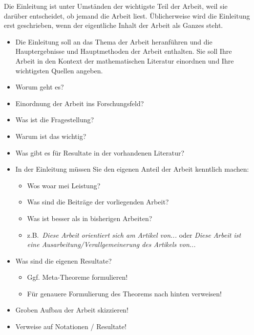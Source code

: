 {\color{change}

\noindent
Die Einleitung ist unter Umständen der wichtigste Teil der Arbeit, weil sie darüber entscheidet, ob jemand die Arbeit liest. Üblicherweise wird die Einleitung erst geschrieben, wenn der eigentliche Inhalt der Arbeit als Ganzes steht.

\begin{itemize}

\item Die Einleitung soll an das Thema der Arbeit heranführen und die Hauptergebnisse und Hauptmethoden der Arbeit enthalten. Sie soll Ihre Arbeit in den Kontext der mathematischen Literatur einordnen und Ihre wichtigsten Quellen angeben.

\item Worum geht es?
\item Einordnung der Arbeit ins Forschungsfeld?
\item Was ist die Fragestellung?
\item Warum ist das wichtig?
\item Was gibt es für Resultate in der vorhandenen Literatur?

\item In der Einleitung müssen Sie den eigenen Anteil der Arbeit kenntlich machen:
\begin{itemize}
\item Wos woar mei Leistung?
\item Was sind die Beiträge der vorliegenden Arbeit?
\item Was ist besser als in bisherigen Arbeiten?
\item z.B.\ \emph{Diese Arbeit orientiert sich am Artikel von...} oder \emph{Diese Arbeit
ist eine Ausarbeitung/Verallgemeinerung des Artikels von...}
\end{itemize}

\item Was sind die eigenen Resultate?
\begin{itemize}
\item Ggf. Meta-Theoreme formulieren!
\item Für genauere Formulierung des Theorems nach hinten verweisen!
\end{itemize}

\item Groben Aufbau der Arbeit skizzieren!
\item Verweise auf Notationen / Resultate!
\end{itemize}
}

